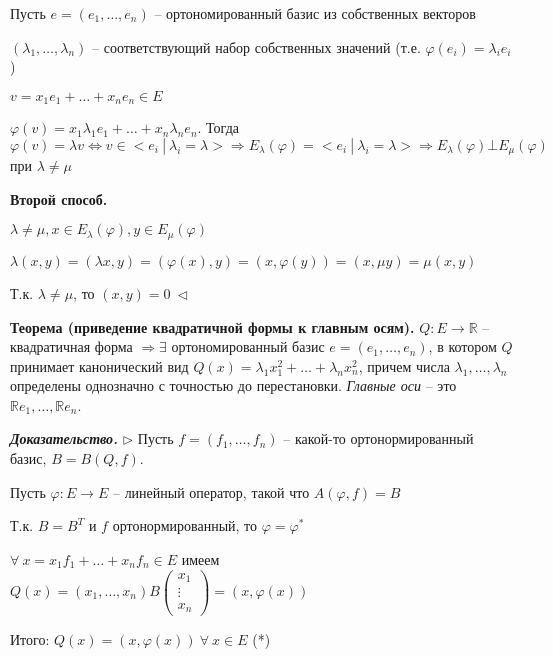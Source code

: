 Пусть $e = (e_1, \dots, e_n)$ -- ортономированный базис из собственных векторов

$(\lambda_1, \dots, \lambda_n)$ -- соответствующий набор собственных значений (т.е. $\varphi (e_i) = \lambda_i e_i$)

$v = x_1 e_1 + \dots + x_n e_n \in E$

$\varphi(v) = x_1 \lambda_1 e_1 + \dots + x_n \lambda_n e_n$. Тогда $\varphi (v) = \lambda v \Leftrightarrow v \in <e_i \ | \ \lambda_i = \lambda> \Rightarrow E_{\lambda} (\varphi) = <e_i \ | \ \lambda_i = \lambda > \Rightarrow E_{\lambda} (\varphi) \bot E_{\mu} (\varphi)$ при $\lambda \neq \mu$

\vspace{\baselineskip}
\textbf{Второй способ.}

$\lambda \neq \mu, x \in E_{\lambda} (\varphi), y \in E_{\mu} (\varphi)$

$\lambda(x, y) = (\lambda x, y) = (\varphi(x), y) = (x, \varphi(y)) = (x, \mu y) = \mu (x, y)$

Т.к. $\lambda \neq \mu$, то $(x, y) = 0 \ \lhd$

\vspace{\baselineskip}
\textbf{Теорема (приведение квадратичной формы к главным осям).} $Q: E \rightarrow \mathbb{R}$ -- квадратичная форма $\Rightarrow \exists$ ортономированный базис $e = (e_1, \dots, e_n)$, в котором $Q$ принимает канонический вид $Q(x) = \lambda_1 x_1^2 + \dots + \lambda_n x_n^2$, причем числа $\lambda_1, \dots, \lambda_n$ определены однозначно с точностью до перестановки. \textit{Главные оси} -- это $\mathbb{R} e_1, \dots, \mathbb{R} e_n$.

\vspace{\baselineskip}
\textbf{\textit{Доказательство.}} $\rhd$ Пусть $f = (f_1, \dots, f_n)$ -- какой-то ортонормированный базис, $B = B(Q, f)$.

Пусть $\varphi: E \rightarrow E$ -- линейный оператор, такой что $A(\varphi, f) = B$

Т.к. $B = B^T$ и $f$ ортонормированный, то $\varphi = \varphi^*$

$\forall \ x = x_1 f_1 + \dots + x_n f_n \in E$ имеем $Q(x) = (x_1, \dots, x_n) B \begin{pmatrix} x_1 \\ \vdots \\ x_n \end{pmatrix} = (x, \varphi(x))$

Итого: $Q(x) = (x, \varphi(x)) \ \forall \ x \in E$ (*)

